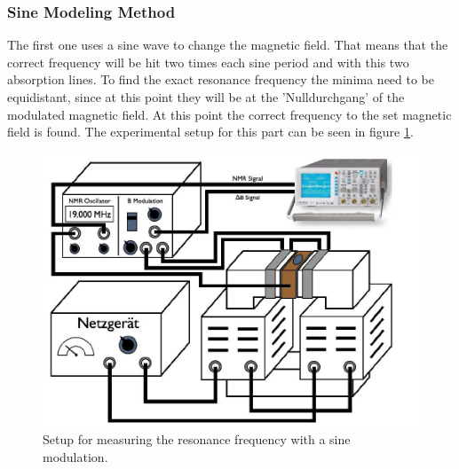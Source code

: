 \subsubsection{Sine Modeling Method}
The first one uses a sine wave to change the magnetic field. That means that the correct frequency will be hit two times each sine period and with this two absorption lines. To find the exact resonance frequency the minima need to be equidistant, since at this point they will be at the 'Nulldurchgang' of the modulated magnetic field. At this point the correct frequency to the set magnetic field is found. The experimental setup for this part can be seen in figure \ref{Exp_part1}.
\begin{figure}[h]
	\includegraphics[scale=1]{Bild/Setup1}
	\centering
	\caption[Block Diagram for Setup 1]{Setup for measuring the resonance frequency with a sine modulation.}
	\label{Exp_part1}
\end{figure}
\FloatBarrier
